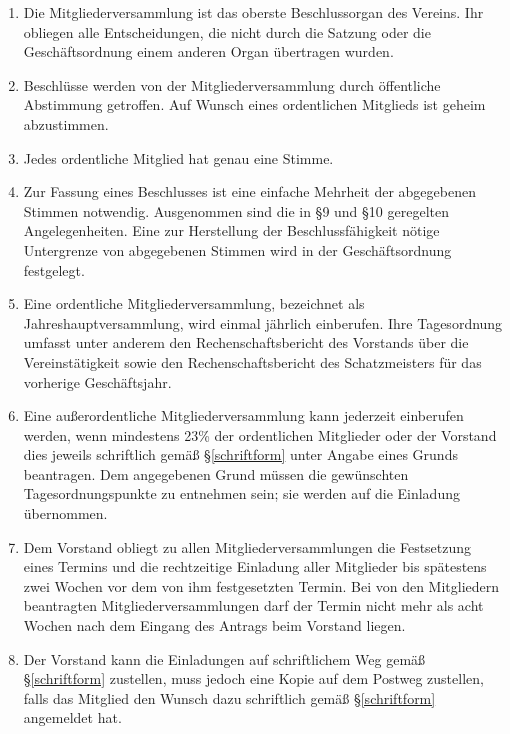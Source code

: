 \documentclass[fontsize=12pt,paper=a4,pagesize]{scrartcl}
\begin{document}
\begin{enumerate}
	\item Die Mitgliederversammlung ist das oberste Beschlussorgan des
		Vereins. Ihr obliegen alle Entscheidungen, die nicht durch die
		Satzung oder die Geschäftsordnung einem anderen Organ übertragen
		wurden.

	\item Beschlüsse werden von der Mitgliederversammlung durch öffentliche
		Abstimmung getroffen. Auf Wunsch eines ordentlichen Mitglieds ist geheim
		abzustimmen.

	\item Jedes ordentliche Mitglied hat genau eine Stimme.

	\item Zur Fassung eines Beschlusses ist eine einfache Mehrheit der
		abgegebenen Stimmen notwendig. Ausgenommen sind die in §9 und §10
		geregelten Angelegenheiten. Eine zur Herstellung der
		Beschlussfähigkeit nötige Untergrenze von abgegebenen Stimmen wird
		in der Geschäftsordnung festgelegt.

	\item Eine ordentliche Mitgliederversammlung, bezeichnet als
		Jahreshauptversammlung, wird einmal jährlich einberufen. Ihre
		Tagesordnung umfasst unter anderem den Rechenschaftsbericht des
		Vorstands über die Vereinstätigkeit sowie den Rechenschaftsbericht des
		Schatzmeisters für das vorherige Geschäftsjahr.

	\item Eine außerordentliche Mitgliederversammlung kann jederzeit
		einberufen werden, wenn mindestens 23\% der ordentlichen Mitglieder
		oder der Vorstand dies jeweils schriftlich gemäß §\ref{schriftform} unter Angabe
		eines Grunds beantragen. Dem angegebenen Grund müssen die gewünschten
		Tagesordnungspunkte zu entnehmen sein; sie werden auf die Einladung
		übernommen.

	\item Dem Vorstand obliegt zu allen Mitgliederversammlungen die
		Festsetzung eines Termins und die rechtzeitige Einladung aller
		Mitglieder bis spätestens zwei Wochen vor dem von ihm festgesetzten
		Termin. Bei von den Mitgliedern beantragten Mitgliederversammlungen
		darf der Termin nicht mehr als acht Wochen nach dem Eingang des Antrags
		beim Vorstand liegen.

	\item Der Vorstand kann die Einladungen auf schriftlichem Weg gemäß §\ref{schriftform}
		zustellen, muss jedoch eine Kopie auf dem Postweg zustellen, falls
		das Mitglied den Wunsch dazu schriftlich gemäß §\ref{schriftform} angemeldet hat.


\end{enumerate}
\end{document}
